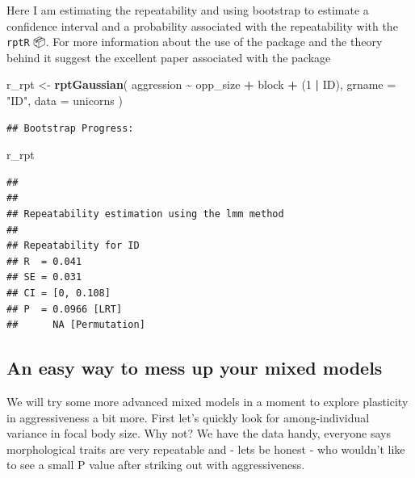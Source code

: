 \documentclass[
  12pt,
]{book}
\newenvironment{Shaded}{\begin{snugshade}}{\end{snugshade}}
\newcommand{\DataTypeTok}[1]{\textcolor[rgb]{0.13,0.29,0.53}{#1}}
\newcommand{\DecValTok}[1]{\textcolor[rgb]{0.00,0.00,0.81}{#1}}
\newcommand{\KeywordTok}[1]{\textcolor[rgb]{0.13,0.29,0.53}{\textbf{#1}}}
\newcommand{\NormalTok}[1]{#1}
\newcommand{\OperatorTok}[1]{\textcolor[rgb]{0.81,0.36,0.00}{\textbf{#1}}}
\newcommand{\StringTok}[1]{\textcolor[rgb]{0.31,0.60,0.02}{#1}}
\begin{document}
Here I am estimating the repeatability and using bootstrap to estimate a confidence interval and a probability associated with the repeatability with the \texttt{rptR} 📦. For more information about the use of the package and the theory behind it suggest the excellent paper associated with the package \citep{rptR2017}

\begin{Shaded}
\begin{Highlighting}[]
\NormalTok{r\_rpt \textless{}{-}}\StringTok{ }\KeywordTok{rptGaussian}\NormalTok{(}
\NormalTok{  aggression }\OperatorTok{\textasciitilde{}}\StringTok{ }\NormalTok{opp\_size }\OperatorTok{+}\StringTok{ }\NormalTok{block }\OperatorTok{+}\StringTok{ }\NormalTok{(}\DecValTok{1} \OperatorTok{|}\StringTok{ }\NormalTok{ID),}
  \DataTypeTok{grname =} \StringTok{"ID"}\NormalTok{, }\DataTypeTok{data =}\NormalTok{ unicorns}
\NormalTok{)}
\end{Highlighting}
\end{Shaded}

\begin{verbatim}
## Bootstrap Progress:
\end{verbatim}

\begin{Shaded}
\begin{Highlighting}[]
\NormalTok{r\_rpt}
\end{Highlighting}
\end{Shaded}

\begin{verbatim}
## 
## 
## Repeatability estimation using the lmm method 
## 
## Repeatability for ID
## R  = 0.041
## SE = 0.031
## CI = [0, 0.108]
## P  = 0.0966 [LRT]
##      NA [Permutation]
\end{verbatim}

\hypertarget{an-easy-way-to-mess-up-your-mixed-models}{%
\subsection{An easy way to mess up your mixed models}\label{an-easy-way-to-mess-up-your-mixed-models}}

We will try some more advanced mixed models in a moment to explore plasticity in aggressiveness a bit more. First let's quickly look for among-individual variance in focal body size. Why not? We have the data handy, everyone says morphological traits are very repeatable and - lets be honest - who wouldn't like to see a small P value after striking out with aggressiveness.
\end{document}

